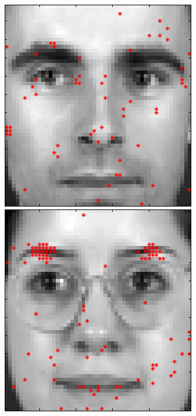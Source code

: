 \begin{figure}[ht]
 \includegraphics[width=\textwidth*11/100]{ch5/figures/XM2VTS_Full_5.png}
 \includegraphics[width=\textwidth*11/100]{ch5/figures/XM2VTS_Full_6.png}

\end{figure}
